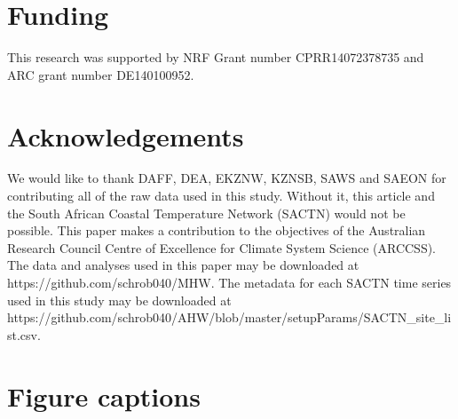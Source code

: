 \documentclass[utf8]{frontiersSCNS}
\begin{document}
\section*{Funding}
This research was supported by NRF Grant number CPRR14072378735 and ARC grant number DE140100952.


\section*{Acknowledgements}
We would like to thank DAFF, DEA, EKZNW, KZNSB, SAWS and SAEON for contributing all of the raw data used in this study. Without it, this article and the South African Coastal Temperature Network (SACTN) would not be possible. This paper makes a contribution to the objectives of the Australian Research Council Centre of Excellence for Climate System Science (ARCCSS). The data and analyses used in this paper may be downloaded at https://github.com/schrob040/MHW. The metadata for each SACTN time series used in this study may be downloaded at https://github.com/schrob040/AHW/blob/master/setupParams/SACTN\_site\_list.csv.






\section*{Figure captions}
\end{document}
